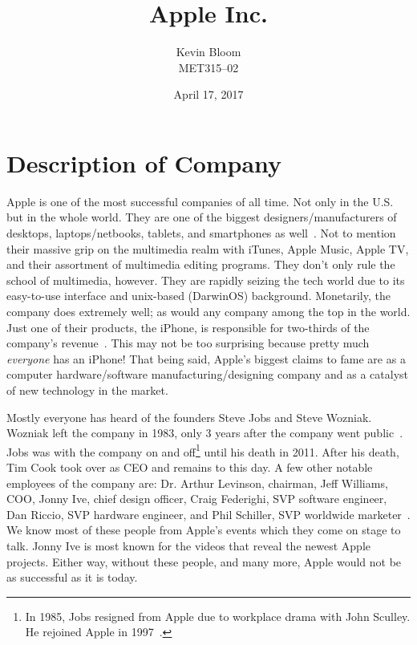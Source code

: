 \documentclass[12pt,a4paper,titlepage]{article}
\begin{document}
\title{Apple Inc.}
\author{Kevin Bloom \\ MET315--02}
\date{April 17, 2017}
\maketitle

\newpage

\tableofcontents

\newpage


\section{Description of Company}
Apple is one of the most successful companies of all time. Not only in the
U.S. but in the whole world. They are one of the biggest designers/manufacturers
of desktops, laptops/netbooks, tablets, and smartphones as
well~\cite{hoover}. Not to mention their massive grip on the multimedia realm
with iTunes, Apple Music, Apple TV, and their assortment of multimedia editing
programs. They don't only rule the school of multimedia, however. They are
rapidly seizing the tech world due to its easy-to-use interface and unix-based
(DarwinOS) background. Monetarily, the company does extremely well; as would any
company among the top in the world. Just one of their products, the iPhone, is
responsible for two-thirds of the company's revenue~\cite{hoover}. This may not
be too surprising because pretty much \emph{everyone} has an iPhone! That being
said, Apple's biggest claims to fame are as a computer hardware/software
manufacturing/designing company and as a catalyst of new technology in the
market.

Mostly everyone has heard of the founders Steve Jobs and Steve Wozniak. Wozniak
left the company in 1983, only 3 years after the company went
public~\cite{hoover}. Jobs was with the company on and off\footnote{In 1985,
  Jobs resigned from Apple due to workplace drama with John Sculley. He rejoined
  Apple in 1997~\cite{jobs}.} until his death in 2011. After his death, Tim Cook
took over as CEO and remains to this day. A few other notable employees of the
company are: Dr. Arthur Levinson, chairman, Jeff Williams, COO, Jonny Ive, chief
design officer, Craig Federighi, SVP software engineer, Dan Riccio, SVP hardware
engineer, and Phil Schiller, SVP worldwide marketer~\cite{hoover}. We know most
of these people from Apple's events which they come on stage to talk. Jonny Ive
is most known for the videos that reveal the newest Apple projects. Either way,
without these people, and many more, Apple would not be as successful as it is
today.
\end{document}
